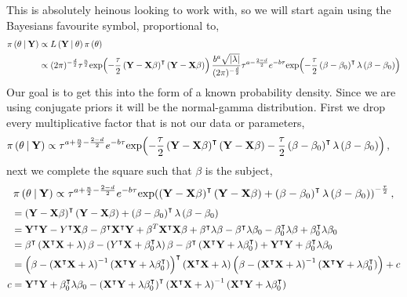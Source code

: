 This is absolutely heinous looking to work with, so we will start again using the Bayesians favourite symbol, proportional to,
\begin{align*}
    \pi \left( \theta \:\middle|\: \mathbf{Y} \right) &\propto L\left( \mathbf{Y} \:\middle|\: \theta \right)\pi\left( \theta \right)\\ 
    &\propto (2\pi)^{-\frac{d}{2}}\tau^{\frac{n}{2}}\mathrm{exp}\!\left( -\frac{\tau}{2}\left(\mathbf{Y} - \mathbf{X}\beta\right)^\intercal\left(\mathbf{Y} - \mathbf{X}\beta\right) \right)\frac{b^a\sqrt{|\lambda|}}{(2\pi)^{-\frac{d}{2}}} \tau^{a-\frac{2-d}{2}}e^{-b\tau}\mathrm{exp}\!\left( -\frac{\tau}{2}\left(\beta-\beta_0\right)^\intercal\lambda\left(\beta-\beta_0\right) \right)\\ 
\end{align*}
Our goal is to get this into the form of a known probability density. Since we are using conjugate priors it will be the normal-gamma distribution. First we drop every multiplicative factor that is not our data or parameters,
\begin{align*}
    \pi \left( \theta \:\middle|\: \mathbf{Y} \right) &\propto \tau^{a+\frac{n}{2}-\frac{2-d}{2}}e^{-b\tau} \mathrm{exp}\!\left( -\frac{\tau}{2}\left(\mathbf{Y} - \mathbf{X}\beta\right)^\intercal\left(\mathbf{Y} - \mathbf{X}\beta\right)-\frac{\tau}{2}\left(\beta-\beta_0\right)^\intercal\lambda\left(\beta-\beta_0\right) \right),
\end{align*}
next we complete the square such that $\beta$ is the subject,
\begin{align*}
    \pi \left( \theta \:\middle|\: \mathbf{Y} \right) &\propto \tau^{a+\frac{n}{2}-\frac{2-d}{2}}e^{-b\tau} \mathrm{exp}\!\left( \left(\mathbf{Y} - \mathbf{X}\beta\right)^\intercal\left(\mathbf{Y} - \mathbf{X}\beta\right) + \left(\beta-\beta_0\right)^\intercal\lambda\left(\beta-\beta_0\right) \right)^{-\frac{\tau}{2}},\\
\end{align*}
\begin{align*}
    &= \left(\mathbf{Y} - \mathbf{X}\beta\right)^\intercal\left(\mathbf{Y} - \mathbf{X}\beta\right) + \left(\beta-\beta_0\right)^\intercal\lambda\left(\beta-\beta_0\right) \\ 
    &= \mathbf{Y}^\intercal \mathbf{Y} - Y^\intercal \mathbf{X}\beta - \beta^\intercal \mathbf{X}^\intercal \mathbf{Y} + \beta^T \mathbf{X}^\intercal \mathbf{X} \beta + \beta^\intercal \lambda \beta - \beta^\intercal \lambda \beta_0 - \beta_0^\intercal \lambda \beta + \beta_0^\intercal \lambda\beta_0\\ 
    &= \beta^\intercal \left(\mathbf{X}^\intercal \mathbf{X} + \lambda \right)\beta - \left(Y^\intercal \mathbf{X} + \beta_0^\intercal\lambda \right)\beta - \beta^\intercal \left(\mathbf{X}^\intercal \mathbf{Y} + \lambda\beta_0^\intercal\right) + \mathbf{Y}^\intercal \mathbf{Y} + \beta_0^\intercal \lambda\beta_0 \\ 
    &= \left(\beta - \left(\mathbf{X}^\intercal \mathbf{X} + \lambda\right)^{-1}\left(\mathbf{X}^\intercal \mathbf{Y} + \lambda \beta_0^\intercal \right)\right)^\intercal\left(\mathbf{X}^\intercal \mathbf{X} + \lambda\right)\left(\beta - \left(\mathbf{X}^\intercal \mathbf{X} + \lambda\right)^{-1}\left(\mathbf{X}^\intercal \mathbf{Y} + \lambda \beta_0^\intercal \right)\right) + c \\ 
    c &= \mathbf{Y}^\intercal \mathbf{Y} + \beta_0^\intercal \lambda\beta_0 - \left(\mathbf{X}^\intercal \mathbf{Y} + \lambda \beta_0^\intercal \right)^\intercal \left(\mathbf{X}^\intercal \mathbf{X} + \lambda\right)^{-1}\left(\mathbf{X}^\intercal \mathbf{Y} + \lambda \beta_0^\intercal \right)
\end{align*}

